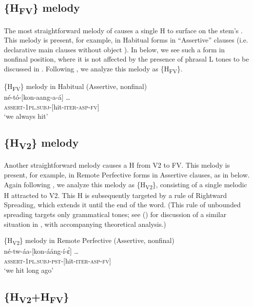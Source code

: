 \documentclass[output=paper,newtxmath,modfonts,nonflat,draft]{langsci/langscibook}
\begin{document}
\subsection{\{H\textsubscript{FV}\} melody}\label{sec:jones:3.2}

The most straightforward melody of  causes a single H  to surface on the stem’s . This melody is present, for example, in Habitual forms in “Assertive” clauses (i.e. declarative main clauses without object ). In  below, we see such a form in nonfinal position, where it is not affected by the presence of phrasal L tones to be discussed in . Following \citet{Roberts-Kohno2014}, we analyze this melody as \{H\textsubscript{FV}\}.

\ea\label{ex:jones:3}
{\{H\textsubscript{FV}\} melody in Habitual (Assertive, nonfinal)}\\
\gll   né-tó-[kon-aang-a-á] …      \\
     \textsc{assert-1pl.subj-[}hit-\textsc{iter-asp-fv]}\\
\glt ‘we always hit’
\z

\subsection{\{H\textsubscript{V2}\} melody}\label{sec:jones:3.3}

Another straightforward melody causes a H  from V2 to FV. This melody is present, for example, in Remote Perfective forms in Assertive clauses, as in  below. Again following \citet{Roberts-Kohno2014}, we analyze this melody as \{H\textsubscript{V2}\}, consisting of a single melodic H  attracted to V2. This H is subsequently targeted by a rule of Rightward Spreading, which extends it until the end of the word. (This rule of unbounded spreading targets only grammatical tones; see \citeauthor{Bickmore1997} (\citeyear{Bickmore1997,Bickmore1999}) for discussion of a similar situation in , with accompanying theoretical analysis.)

\ea\label{ex:jones:4}
{\{H\textsubscript{V2}\} melody in Remote Perfective (Assertive, nonfinal)}\\
\gll   né-tw-áa-[kon-ááng-í-\'ɛ] …      \\
       \textsc{assert-1pl.subj-pst-[}hit-\textsc{iter-asp-fv]}\\
\glt   ‘we hit long ago’
\z

\subsection{\{H\textsubscript{V2}+H\textsubscript{FV}\}}\label{sec:jones:3.4}
\end{document}
